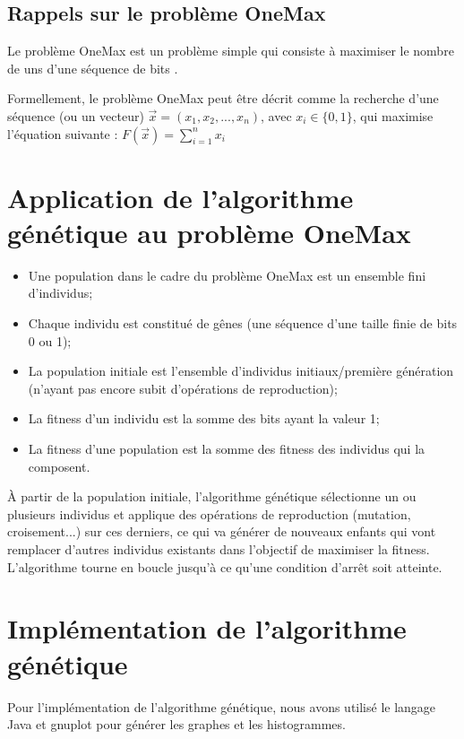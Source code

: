 \documentclass[12pt]{article}
\begin{document}
\subsection{Rappels sur le problème OneMax}
\par Le problème OneMax est un problème simple qui consiste à maximiser le nombre de uns d'une séquence de bits \cite{onemax}.
\par Formellement, le problème OneMax peut être décrit comme la recherche d'une séquence (ou un vecteur) $ \vec{x} = (x_1, x_2, ... , x_n) $, avec $ x_i \in \{0,1\} $, qui maximise l'équation suivante : $ F(\vec{x}) = \sum_{i=1}^{n} x_i $

\section{Application de l'algorithme génétique au problème OneMax}
\begin{itemize}[label=-]
\item Une population dans le cadre du problème OneMax est un ensemble fini d'individus;
\item Chaque individu est constitué de gênes (une séquence d'une taille finie de bits 0 ou 1);
\item La population initiale est l'ensemble d'individus initiaux/première génération (n'ayant pas encore subit d'opérations de reproduction);
\item La fitness d'un individu est la somme des bits ayant la valeur 1;
\item La fitness d'une population est la somme des fitness des individus qui la composent.
\end{itemize}

\par À partir de la population initiale, l'algorithme génétique sélectionne un ou plusieurs individus et applique des opérations de reproduction (mutation, croisement...) sur ces derniers, ce qui va générer de nouveaux enfants qui vont remplacer d'autres individus existants dans l'objectif de maximiser la fitness. L'algorithme tourne en boucle jusqu'à ce qu'une condition d'arrêt soit atteinte. 

\section{Implémentation de l'algorithme génétique}
Pour l'implémentation de l'algorithme génétique, nous avons utilisé le langage Java et gnuplot pour générer les graphes et les histogrammes.
\end{document}
